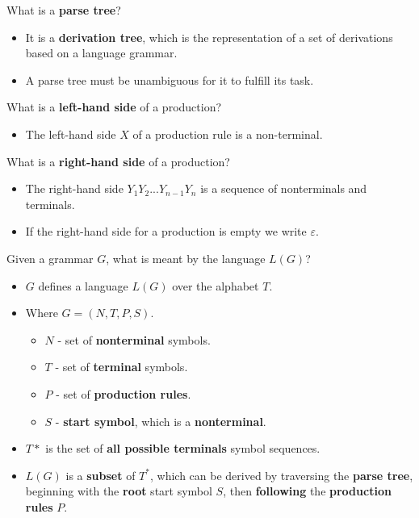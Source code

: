 \documentclass[11pt]{beamer}
\begin{document}
\begin{frame}
\begin{block}{What is a \textbf{parse tree}?}
\begin{itemize}
\item It is a \textbf{derivation tree}, which is the representation of a set of derivations based on a language grammar.
\item A parse tree must be unambiguous for it to fulfill its task.
\end{itemize}
\end{block}


\begin{block}{What is a \textbf{left-hand side} of a production?}
\begin{itemize}
\item The left-hand side $X$ of a production rule is a non-terminal.
\end{itemize}
\end{block}

\begin{block}{What is a \textbf{right-hand side} of a production?}
\begin{itemize}
\item The right-hand side $Y_1 Y_2 ... Y_{n-1} Y_{n}$  is a sequence of nonterminals and terminals.
\item If the right-hand side for a production is empty we write $\varepsilon$.
\end{itemize}
\end{block}

\end{frame}

\begin{frame}


\begin{block}{Given a grammar $G$, what is meant by the language $L(G)$?}
\begin{itemize}
\item $G$ defines a language $L(G)$ over the alphabet $T$.
\item Where $G=(N,T,P,S)$.
\begin{itemize}
\item $N$ - set of \textbf{nonterminal} symbols.
\item $T$ - set of \textbf{terminal} symbols.
\item $P$ - set of \textbf{production rules}.
\item $S$ - \textbf{start symbol}, which is a \textbf{nonterminal}.
\end{itemize}
\item $T*$ is the set of \textbf{all possible terminals} symbol sequences.
\item $L(G)$ is a \textbf{subset} of $T^*$, which can be derived by traversing the \textbf{parse tree}, beginning with the \textbf{root} start symbol $S$, then \textbf{following} the \textbf{production rules} $P$.
\end{itemize}
\end{block}


\end{frame}
\end{document}
